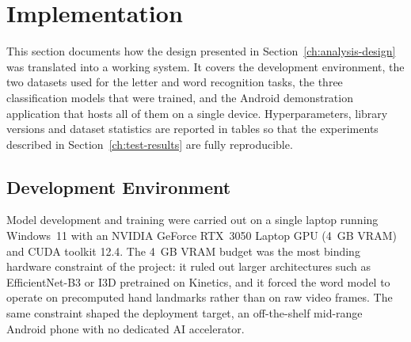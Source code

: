 \chapter{Implementation}
\label{ch:implementation}

This section documents how the design presented in
Section~\ref{ch:analysis-design} was translated into a working system. It
covers the development environment, the two datasets used for the letter
and word recognition tasks, the three classification models that were
trained, and the Android demonstration application that hosts all of
them on a single device. Hyperparameters, library versions and dataset
statistics are reported in tables so that the experiments described in
Section~\ref{ch:test-results} are fully reproducible.

\section{Development Environment}
\label{sec:impl-environment}

Model development and training were carried out on a single laptop
running Windows~11 with an NVIDIA GeForce RTX~3050 Laptop GPU (4~GB
VRAM) and CUDA toolkit 12.4. The 4~GB VRAM budget was the most binding
hardware constraint of the project: it ruled out larger architectures
such as EfficientNet-B3 or I3D pretrained on Kinetics, and it forced
the word model to operate on precomputed hand landmarks rather than on
raw video frames. The same constraint shaped the deployment target, an
off-the-shelf mid-range Android phone with no dedicated AI accelerator.

